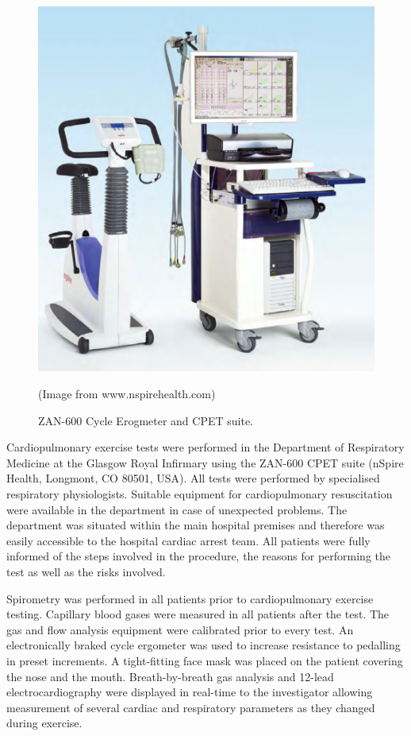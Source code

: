 \begin{figure}[htbp]
	\centering
	\includegraphics[width=\textwidth]{Figures/cpet-zan}
	\caption{ZAN-600 Cycle Erogmeter and CPET suite.}
	(Image from www.nspirehealth.com)
	\label{fig:cpet-zan}
\end{figure}

Cardiopulmonary exercise tests were performed in the Department of Respiratory Medicine at the Glasgow Royal Infirmary using the ZAN-600 CPET suite (nSpire Health, Longmont, CO 80501, USA). 
All tests were performed by specialised respiratory physiologists. 
Suitable equipment for cardiopulmonary resuscitation were available in the department in case of unexpected problems. 
The department was situated within the main hospital premises and therefore was easily accessible to the hospital cardiac arrest team. 
All patients were fully informed of the steps involved in the procedure, the reasons for performing the test as well as the risks involved. 

Spirometry was performed in all patients prior to cardiopulmonary exercise testing. 
Capillary blood gases were measured in all patients after the test. 
The gas and flow analysis equipment were calibrated prior to every test.
An electronically braked cycle ergometer was used to increase resistance to pedalling in preset increments. 
A tight-fitting face mask was placed on the patient covering the nose and the mouth. 
Breath-by-breath gas analysis and 12-lead electrocardiography were displayed in real-time to the investigator allowing measurement of several cardiac and respiratory parameters as they changed during exercise.


